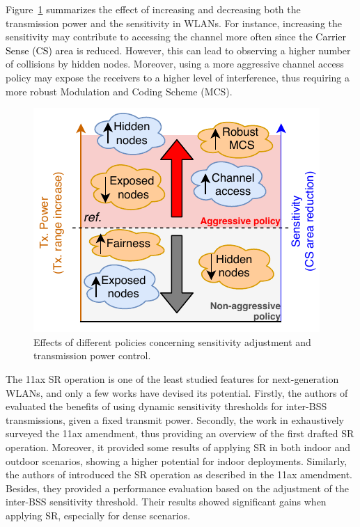 \documentclass[preprint,12pt]{elsarticle}
\theoremstyle{plain}
\begin{document}
Figure~\ref{fig:policies_sr} \textcolor{black}{summarizes} the effect of increasing and decreasing both the transmission power and the sensitivity in WLANs. For instance, increasing the sensitivity may contribute to accessing the channel more often since the \textcolor{black}{Carrier Sense (CS) area} is reduced. However, this can lead to observing a higher number of collisions by hidden nodes. Moreover, using a more aggressive channel access policy may expose the receivers to a higher level of interference, thus requiring a more robust Modulation and Coding Scheme (MCS).
\begin{figure}[ht!]
	\centering
	\includegraphics[width=0.4\columnwidth]{policies_sr}
	\caption{Effects of different policies concerning sensitivity adjustment and transmission power control.}
	\label{fig:policies_sr}
\end{figure}

The 11ax SR operation is one of the least studied features for next-generation WLANs, and only a few works have devised its potential. Firstly, the authors of \cite{mori2014performance} evaluated the benefits of using dynamic sensitivity thresholds for inter-BSS transmissions, given a fixed transmit power. Secondly, the work in \cite{qu2018survey} exhaustively surveyed the 11ax amendment, thus providing an overview of the first drafted SR operation. Moreover, it provided some results of applying SR in both indoor and outdoor scenarios, showing a higher potential for indoor deployments. Similarly, the authors of \cite{shen2018research} introduced the SR operation as described in the 11ax amendment. Besides, they provided a performance evaluation based on the adjustment of the inter-BSS sensitivity threshold. Their results showed significant gains when applying SR, especially for dense scenarios. 
\end{document}

